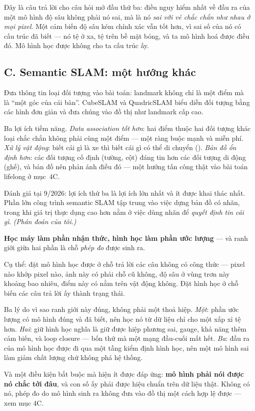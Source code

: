 \documentclass[../../vslam.tex]{subfiles}
\begin{document}
Đây là câu trả lời cho câu hỏi mở đầu thứ ba: điều nguy hiểm nhất về đầu ra của một mô hình độ sâu không phải nó sai, mà là nó \emph{sai với vẻ chắc chắn như nhau ở mọi pixel}. Một cảm biến độ sâu kém chính xác vẫn tốt hơn, vì sai số của nó có cấu trúc đã biết --- nó tệ ở xa, tệ trên bề mặt bóng, và ta mô hình hoá được điều đó. Mô hình học được không cho ta cấu trúc ấy.

\subsection{C. Semantic SLAM: một hướng khác}

Đưa thông tin loại đối tượng vào bài toán: landmark không chỉ là một điểm mà là ``một góc của cái bàn''. CubeSLAM \cite{yang2019cubeslam} và QuadricSLAM \cite{nicholson2019quadricslam} biểu diễn đối tượng bằng các hình đơn giản và đưa chúng vào đồ thị như landmark cấp cao.

Ba lợi ích tiềm năng. \emph{Data association tốt hơn}: hai điểm thuộc hai đối tượng khác loại chắc chắn không phải cùng một điểm --- một ràng buộc mạnh và miễn phí. \emph{Xử lý vật động}: biết cái gì là xe thì biết cái gì có thể di chuyển (). \emph{Bản đồ ổn định hơn}: các đối tượng cố định (tường, cột) đáng tin hơn các đối tượng di động (ghế), và bản đồ nên phản ánh điều đó --- một hướng tấn công thật vào bài toán lifelong ở  mục~4C.

Đánh giá tại 9/2026: lợi ích thứ ba là lợi ích lớn nhất và ít được khai thác nhất. Phần lớn công trình semantic SLAM tập trung vào việc dựng bản đồ có nhãn, trong khi giá trị thực dụng cao hơn nằm ở việc dùng nhãn để \emph{quyết định tin cái gì}. \emph{(Phán đoán của tôi.)}

\begin{cannho}
\textbf{Học máy làm phần nhận thức, hình học làm phần ước lượng} --- và ranh giới giữa hai phần là chỗ \emph{phép đo} được sinh ra.

Cụ thể: đặt mô hình học được ở chỗ trả lời các câu không có công thức --- pixel nào khớp pixel nào, ảnh này có phải chỗ cũ không, độ sâu ở vùng trơn này khoảng bao nhiêu, điểm này có nằm trên vật động không. Đặt hình học ở chỗ biến các câu trả lời ấy thành trạng thái.

Ba lý do vì sao ranh giới này đúng, không phải một thoả hiệp. \emph{Một}: phần ước lượng có mô hình đúng và đã biết, nên học nó từ dữ liệu chỉ cho một xấp xỉ tệ hơn. \emph{Hai}: giữ hình học nghĩa là giữ được hiệp phương sai, gauge, khả năng thêm cảm biến, và loop closure --- bốn thứ mà một mạng đầu-cuối mất hết. \emph{Ba}: đầu ra của mô hình học được đi qua một tầng kiểm định hình học, nên một mô hình sai làm giảm chất lượng chứ không phá hệ thống.

Và một điều kiện bắt buộc mà hiện ít được đáp ứng: \textbf{mô hình phải nói được nó chắc tới đâu}, và con số ấy phải được hiệu chuẩn trên dữ liệu thật. Không có nó, phép đo do mô hình sinh ra không đưa vào đồ thị một cách hợp lệ được --- xem  mục 4C.
\end{cannho}
\end{document}

